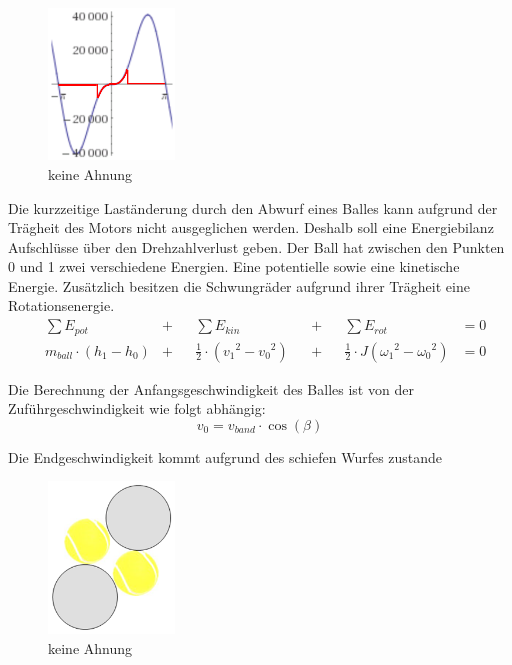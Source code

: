 \begin{figure}[h!]
\centering	\includegraphics[width=0.3\textwidth]{Enddokumentation/Anhang/Bilder/WeissNicht.png}
	\caption{keine Ahnung}
	\label{fig:keineAhnung}
\end{figure}
Die kurzzeitige Laständerung durch den Abwurf eines Balles kann aufgrund der Trägheit des
Motors nicht ausgeglichen werden. Deshalb soll eine Energiebilanz Aufschlüsse über den
Drehzahlverlust geben. Der Ball hat zwischen den Punkten 0 und 1 zwei verschiedene Energien.
Eine potentielle sowie eine kinetische Energie. Zusätzlich besitzen die Schwungräder
aufgrund ihrer Trägheit eine Rotationsenergie.
\begin{align}
 &\sum E_{pot} &+&& \sum E_{kin} &&+&& \sum E_{rot} &= 0 \\
 & m_{ball} \cdot \left(h_1 - h_0\right) &+&&\frac{1}{2} \cdot \left( v_1{^{2}} - v_0{^{2}} \right) &&+&&\frac{1}{2} \cdot J \left( \omega_1{^{2}} - \omega_0{^{2}} \right) &= 0
\end{align}

Die Berechnung der Anfangsgeschwindigkeit des Balles ist von der Zuführgeschwindigkeit wie
folgt abhängig:
\begin{equation}
 v_0 = v_{band} \cdot \cos(\beta)
\end{equation}

Die Endgeschwindigkeit kommt aufgrund des schiefen Wurfes zustande
\begin{figure}[h!]
	\centering
	\includegraphics[width=0.3\textwidth]{Enddokumentation/Anhang/Bilder/Ballnachfuehrung.png}
	\caption{keine Ahnung}
	\label{fig:Ballnachführung}
\end{figure}

